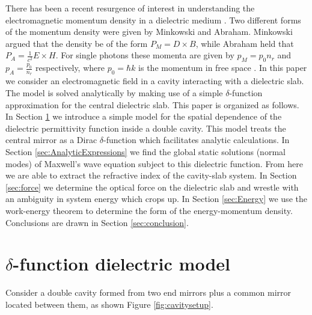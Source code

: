 \documentclass[twocolumn,english,pra,aps,superscriptaddress,floatfix]{revtex4-1}
\begin{document}
There has been a recent resurgence of interest in understanding the electromagnetic momentum density in a dielectric medium \cite{barnett,chiao,mansuripur,ketterle,feng,hinds,loudon}.  Two different forms of the momentum density were given by Minkowski and Abraham.  Minkowski argued that the density be of the form $P_M=D\times B$, while Abraham held that $P_A=\frac{1}{c^2}E\times H$.  For single photons these momenta are given by $p_M= p_{0} n_{r}$ and $p_A=\frac{p_{0}}{n_{r}}$ respectively, where $p_0=\hbar k$ is the momentum in free space . In this paper we consider an electromagnetic field in a cavity interacting with a dielectric slab. The model is solved analytically by making use of a simple $\delta$-function approximation for the central dielectric slab. 
This paper is organized as follows. In Section \ref{sec:deltafunctionmodel} we introduce a simple model for the spatial dependence of the dielectric permittivity function inside a double cavity. This model treats the central mirror as a Dirac $\delta$-function which facilitates analytic calculations. In Section \ref{sec:AnalyticExpressions} we find the global static solutions (normal modes) of Maxwell's wave equation subject to this dielectric function.  From here we are able to extract the refractive index of the cavity-slab system. In Section \ref{sec:force} we determine the optical force on the dielectric slab and wrestle with an ambiguity in system energy which crops up. In Section \ref{sec:Energy} we use the work-energy theorem to determine the form of the energy-momentum density. Conclusions are drawn in Section \ref{sec:conclusion}.




\section{$\delta$-function dielectric model}
\label{sec:deltafunctionmodel}



Consider a double cavity formed from two end mirrors plus a common mirror located between them, as shown Figure \ref{fig:cavitysetup}.  
\end{document}
